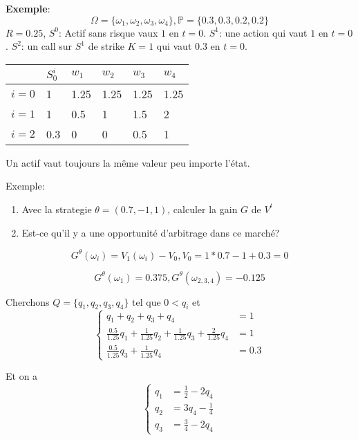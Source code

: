 \documentclass{article}
\theoremstyle{plain}
\theoremstyle{definition}
\begin{document}
\textbf{Exemple}:
\begin{equation}
\Omega=\{\omega_1, \omega_2,\omega_3, \omega_4\}, \mathbb{P}=\{0.3, 0.3,0.2,0.2\}
\end{equation}
$R=0.25$, $S^0$: Actif sans risque vaux $1$ en $t=0$.
$S^1$: une action qui vaut $1$ en $t=0$.
$S^2$: un call sur $S^1$ de strike $K=1$ qui vaut $0.3$ en $t=0$.
\begin{center}
\begin{tabular}{l||l|l|l|l|l}
		& $S_0^i$ & $w_1$ & $w_2$ & $w_3$ & $w_4$\\ \hline \hline
	$i=0$ & 1 & 1.25 & 1.25 & 1.25 & 1.25 \\	 \hline 
	$i=1$ & 1 & 0.5 & 1 & 1.5 & 2 \\ \hline 
	$i=2$ & 0.3 & 0 & 0 & 0.5 & 1 \\ 
\end{tabular}
\end{center}

Un actif vaut toujours la m\^{e}me valeur peu importe l'\'etat.

Exemple:
\begin{enumerate}
	\item Avec la strategie $\theta=(0.7, -1, 1)$, calculer la gain $G$ de $V^t$
	\item Est-ce qu'il y a une opportunit\'e d'arbitrage dans ce march\'e?
\end{enumerate}

\begin{equation}
G^\theta(\omega_i)=V_1(\omega_i)-V_0, V_0=1*0.7-1+0.3=0
\end{equation}

\begin{equation}
G^\theta(\omega_1)=0.375, G^\theta(\omega_{2,3,4})=-0.125
\end{equation}

Cherchons $Q=\{q_1,q_2,q_3,q_4\}$ tel que $0<q_i$ et
\begin{equation}
\left\{ \begin{array}{rcl}
	q_1+q_2+q_3+q_4 &= 1 \\
	\frac{0.5}{1.25} q_1+\frac{1}{1.25} q_2+\frac{1}{1.25} q_3 + \frac{2}{1.25} q_4 &= 1 \\
	\frac{0.5}{1.25} q_3 + \frac{1}{1.25} q_4 &=0.3
\end{array}\right.
\end{equation}

Et on a
\begin{equation}
\left\{ \begin{array}{rcl}
q_1&=\frac{1}{2}-2q_4 \\
q_2&=3q_4-\frac{1}{4} \\ 
q_3&=\frac{3}{4}-2q_4
\end{array}\right.
\end{equation}
\end{document}
